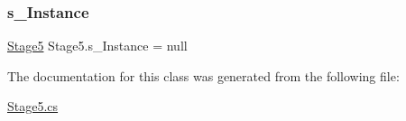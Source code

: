 \subsubsection{\texorpdfstring{s\+\_\+\+Instance}{s\_Instance}}
{\footnotesize\ttfamily \mbox{\hyperlink{class_stage5}{Stage5}} Stage5.\+s\+\_\+\+Instance = null\hspace{0.3cm}{\ttfamily [static]}}



The documentation for this class was generated from the following file\+:\begin{DoxyCompactItemize}
\item 
\mbox{\hyperlink{_stage5_8cs}{Stage5.\+cs}}\end{DoxyCompactItemize}
